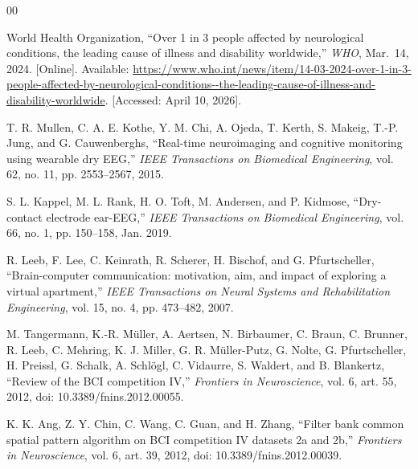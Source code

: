 \begin{thebibliography}{00}



World Health Organization, ``Over 1 in 3 people affected by neurological conditions, the leading cause of illness and disability worldwide,'' \textit{WHO}, Mar.\ 14, 2024. [Online]. Available: \url{https://www.who.int/news/item/14-03-2024-over-1-in-3-people-affected-by-neurological-conditions--the-leading-cause-of-illness-and-disability-worldwide}. [Accessed: April 10, 2026].


T. R. Mullen, C. A. E. Kothe, Y. M. Chi, A. Ojeda, T. Kerth, S. Makeig,
T.-P. Jung, and G. Cauwenberghs, ``Real-time neuroimaging and cognitive monitoring
using wearable dry EEG,'' \textit{IEEE Transactions on Biomedical Engineering},
vol. 62, no. 11, pp. 2553--2567, 2015.

S. L. Kappel, M. L. Rank, H. O. Toft, M. Andersen, and P. Kidmose,
``Dry-contact electrode ear-EEG,'' \textit{IEEE Transactions on Biomedical
Engineering}, vol. 66, no. 1, pp. 150--158, Jan. 2019.

R. Leeb, F. Lee, C. Keinrath, R. Scherer, H. Bischof, and G. Pfurtscheller,
``Brain-computer communication: motivation, aim, and impact of exploring a virtual
apartment,'' \textit{IEEE Transactions on Neural Systems and Rehabilitation Engineering},
vol. 15, no. 4, pp. 473--482, 2007.

M. Tangermann, K.-R. M\"{u}ller, A. Aertsen, N. Birbaumer, C. Braun, C. Brunner,
R. Leeb, C. Mehring, K. J. Miller, G. R. M\"{u}ller-Putz, G. Nolte, G. Pfurtscheller,
H. Preissl, G. Schalk, A. Schl\"{o}gl, C. Vidaurre, S. Waldert, and B. Blankertz,
``Review of the BCI competition IV,'' \textit{Frontiers in Neuroscience}, vol. 6,
art. 55, 2012, doi: 10.3389/fnins.2012.00055.

K. K. Ang, Z. Y. Chin, C. Wang, C. Guan, and H. Zhang, ``Filter bank common spatial
pattern algorithm on BCI competition IV datasets 2a and 2b,'' \textit{Frontiers in
Neuroscience}, vol. 6, art. 39, 2012, doi: 10.3389/fnins.2012.00039.


\end{thebibliography}

